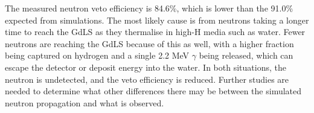 \par
The measured neutron veto efficiency is 84.6\%, which is lower than the 91.0\% expected from simulations.
The most likely cause is from neutrons taking a longer time to reach the GdLS as they thermalise in high-H media such as water.
Fewer neutrons are reaching the GdLS because of this as well, with a higher fraction being captured on hydrogen and a single 2.2 MeV $\gamma$ being released, which can escape the detector or deposit energy into the water.
In both situations, the neutron is undetected, and the veto efficiency is reduced.
Further studies are needed to determine what other differences there may be between the simulated neutron propagation and what is observed.



